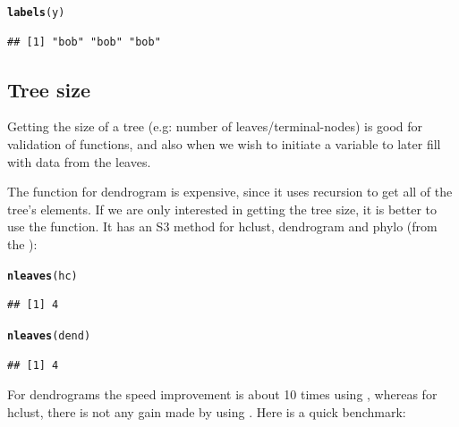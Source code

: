\documentclass[shortnames,nojss,article]{jss}\usepackage{graphicx, color}
\makeatletter
\newcommand{\hlfunctioncall}[1]{\textcolor[rgb]{0.501960784313725,0,0.329411764705882}{\textbf{#1}}}%
\newenvironment{kframe}{%
 \def\at@end@of@kframe{}%
 \ifinner\ifhmode%
  \def\at@end@of@kframe{\end{minipage}}%
  \begin{minipage}{\columnwidth}%
 \fi\fi%
 \def\FrameCommand##1{\hskip\@totalleftmargin \hskip-\fboxsep
 \colorbox{shadecolor}{##1}\hskip-\fboxsep
     \hskip-\linewidth \hskip-\@totalleftmargin \hskip\columnwidth}%
 \MakeFramed {\advance\hsize-\width
   \@totalleftmargin\z@ \linewidth\hsize
   \@setminipage}}%
 {\par\unskip\endMakeFramed%
 \at@end@of@kframe}
\newenvironment{knitrout}{}{} %
\makeatother
\begin{document}
\begin{knitrout}
\begin{kframe}
{\ttfamily\noindent\color{warningcolor}{\#\# Warning: The lengths of the new labels is shorter than the length of the object's colnames - labels are recycled.}}\begin{alltt}
\hlfunctioncall{labels}(y)
\end{alltt}
\begin{verbatim}
## [1] "bob" "bob" "bob"
\end{verbatim}
\end{kframe}
\end{knitrout}



\subsection{Tree size}

Getting the size of a tree (e.g: number of leaves/terminal-nodes) is good for validation of functions, and also when we wish to initiate a variable to later fill with data from the leaves. 

The  function for dendrogram is expensive, since it uses recursion to get all of the tree's elements. If we are only interested in getting the tree size, it is better to use the  function. It has an S3 method for hclust, dendrogram and phylo (from the ):

\begin{knitrout}
\color{fgcolor}\begin{kframe}
\begin{alltt}
\hlfunctioncall{nleaves}(hc)
\end{alltt}
\begin{verbatim}
## [1] 4
\end{verbatim}
\begin{alltt}
\hlfunctioncall{nleaves}(dend)
\end{alltt}
\begin{verbatim}
## [1] 4
\end{verbatim}
\end{kframe}
\end{knitrout}


For dendrograms the speed improvement is about 10 times using , whereas for hclust, there is not any gain made by using . Here is a quick benchmark:
\end{document}
